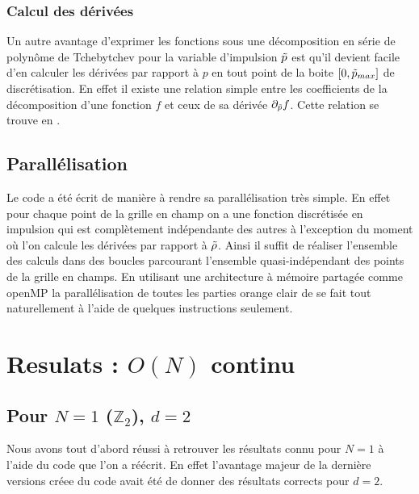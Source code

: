 \documentclass[10.5pt]{article}
\begin{document}
\begin{multicols*}{2}
\subsubsection{Calcul des dérivées}

Un autre avantage d'exprimer les fonctions sous une décomposition en série de polynôme de Tchebytchev pour la variable d'impulsion $\tilde{p}$ est qu'il devient facile d'en calculer les dérivées par rapport à $p$ en tout point de la boite $[0, \tilde{p}_{max}]$ de discrétisation. En effet il existe une relation simple entre les coefficients de la décomposition d'une fonction $f$ et ceux de sa dérivée $\partial_{\tilde{p}} f$. Cette relation se trouve en . \\


\subsection{Parallélisation}


Le code a été écrit de manière à rendre sa parallélisation très simple. En effet pour chaque point de la grille en champ on a une fonction discrétisée en impulsion qui est complètement indépendante des autres à l'exception du moment où l'on calcule les dérivées par rapport à $\tilde{\rho}$. Ainsi il suffit de réaliser l'ensemble des calculs dans des boucles parcourant l'ensemble quasi-indépendant des points de la grille en champs. En utilisant une architecture à mémoire partagée comme openMP \cite{openmp2002c++} la parallélisation de toutes les parties orange clair de  se fait tout naturellement à l'aide de quelques instructions seulement. 



\section{Resulats : $O(N)$ continu}

\label{sec:ResContinu}

\subsection{Pour $N = 1$ ($\mathbb{Z}_2$), $d=2$}

Nous avons tout d'abord réussi à retrouver les résultats connu pour $N=1$ à l'aide du code que l'on a réécrit. En effet l'avantage majeur de la dernière versions créee du code avait été de donner des résultats corrects pour $d = 2$.


\end{multicols*}
\end{document}
